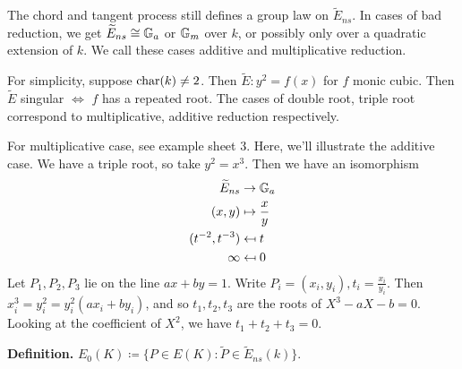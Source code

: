 \documentclass[10pt,a4paper]{article}
\begin{document}
The chord and tangent process still defines a group law on $\tilde{E}_{ns}$. In cases of bad reduction, we get $\widetilde{E}_{ns} \cong \mathbb{G}_a$ or $\mathbb{G}_m$ over $k$, or possibly only over a quadratic extension of $k$. We call these cases additive and multiplicative reduction.

For simplicity, suppose $\operatorname{char}(k) \neq 2$. Then $\tilde{E}: y^2 = f(x)$ for $f$ monic cubic. Then $\tilde{E}$ singular $\iff$ $f$ has a repeated root. The cases of double root, triple root correspond to multiplicative, additive reduction respectively.

For multiplicative case, see example sheet 3. Here, we'll illustrate the additive case. We have a triple root, so take $y^2 = x^3$. Then we have an isomorphism
\begin{align*}
  \widetilde{E}_{ns} & \to \mathbb{G}_a\\
  (x, y) &\mapsto \frac{x}{y}\\
  (t^{-2}, t^{-3}) &\mapsfrom t\\
  \infty &\mapsfrom 0
\end{align*}
Let $P_1, P_2, P_3$ lie on the line $ax+by=1$. Write $P_i = (x_i, y_i), t_i = \frac{x_i}{y_i}$. Then $x_i^3 = y_i^2 = y_i^2(ax_i+by_i)$, and so $t_1, t_2, t_3$ are the roots of $X^3-aX-b = 0$. Looking at the coefficient of $X^2$, we have $t_1+t_2+t_3 = 0$.

\textbf{Definition.} $E_0(K) \coloneqq \{P \in E(K) : \tilde{P} \in \tilde{E}_{ns}(k)\}$.
\end{document}
